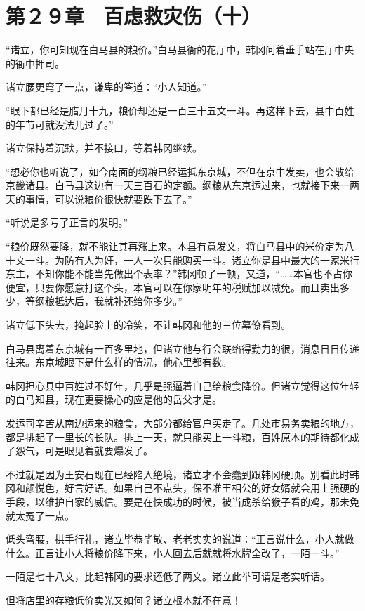 \section{第２９章　百虑救灾伤（十）}

“诸立，你可知现在白马县的粮价。”白马县衙的花厅中，韩冈问着垂手站在厅中央的衙中押司。

诸立腰更弯了一点，谦卑的答道：“小人知道。”

“眼下都已经是腊月十九，粮价却还是一百三十五文一斗。再这样下去，县中百姓的年节可就没法儿过了。”

诸立保持着沉默，并不接口，等着韩冈继续。

“想必你也听说了，如今南面的纲粮已经运抵东京城，不但在京中发卖，也会散给京畿诸县。白马县这边有一天三百石的定额。纲粮从东京运过来，也就接下来一两天的事情，可以说粮价很快就要跌下去了。”

“听说是多亏了正言的发明。”

“粮价既然要降，就不能让其再涨上来。本县有意发文，将白马县中的米价定为八十文一斗。为防有人为奸，一人一次只能购买一斗。诸立你是县中最大的一家米行东主，不知你能不能当先做出个表率？”韩冈顿了一顿，又道，“……本官也不占你便宜，只要你愿意打这个头，本官可以在你家明年的税赋加以减免。而且卖出多少，等纲粮抵达后，我就补还给你多少。”

诸立低下头去，掩起脸上的冷笑，不让韩冈和他的三位幕僚看到。

白马县离着东京城有一百多里地，但诸立他与行会联络得勤力的很，消息日日传递往来。东京城眼下是什么样的情况，他心里都有数。

韩冈担心县中百姓过不好年，几乎是强逼着自己给粮食降价。但诸立觉得这位年轻的白马知县，现在更要操心的应是他的岳父才是。

发运司辛苦从南边运来的粮食，大部分都给官户买走了。几处市易务卖粮的地方，都是排起了一里长的长队。排上一天，就只能买上一斗粮，百姓原本的期待都化成了怨气，可是眼见着就要爆发了。

不过就是因为王安石现在已经陷入绝境，诸立才不会蠢到跟韩冈硬顶。别看此时韩冈和颜悦色，好言好语。如果自己不点头，保不准王相公的好女婿就会用上强硬的手段，以维护自家的威信。要是在快成功的时候，被当成杀给猴子看的鸡，那未免就太冤了一点。

低头弯腰，拱手行礼，诸立毕恭毕敬、老老实实的说道：“正言说什么，小人就做什么。正言让小人将粮价降下来，小人回去后就就将水牌全改了，一陌一斗。”

一陌是七十八文，比起韩冈的要求还低了两文。诸立此举可谓是老实听话。

但将店里的存粮低价卖光又如何？诸立根本就不在意！

